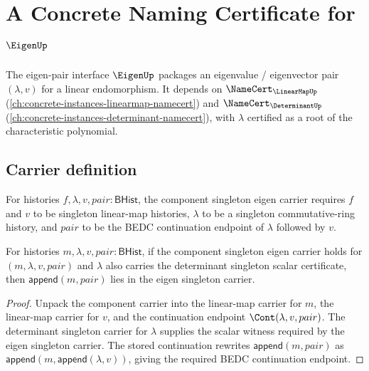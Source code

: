 \chapter{A Concrete Naming Certificate for $\EigenUp$}
\label{ch:concrete-instances-eigen-namecert}

The eigen-pair interface $\EigenUp$ packages an eigenvalue / eigenvector pair $(\lambda, v)$ for a linear endomorphism. It depends on $\NameCert_{\LinearMapUp}$ (\autoref{ch:concrete-instances-linearmap-namecert}) and $\NameCert_{\DeterminantUp}$ (\autoref{ch:concrete-instances-determinant-namecert}), with $\lambda$ certified as a root of the characteristic polynomial.

\section{Carrier definition}
\label{sec:eigen-carrier}

\begin{definition}
\label{def:eigen-component-singleton-carrier}
For histories $f,\lambda,v,pair:\mathsf{BHist}$, the component singleton
eigen carrier requires $f$ and $v$ to be singleton linear-map histories,
$\lambda$ to be a singleton commutative-ring history, and $pair$ to be the
BEDC continuation endpoint of $\lambda$ followed by $v$.
\end{definition}

\begin{theorem}
\label{thm:eigen-component-singleton-carrier-singleton-append}
For histories $m,\lambda,v,pair:\mathsf{BHist}$, if the component singleton
eigen carrier holds for $(m,\lambda,v,pair)$ and $\lambda$ also carries the
determinant singleton scalar certificate, then
$\mathsf{append}(m,pair)$ lies in the eigen singleton carrier.
\end{theorem}
\begin{proof}
Unpack the component carrier into the linear-map carrier for $m$, the
linear-map carrier for $v$, and the continuation endpoint
$\Cont(\lambda,v,pair)$. The determinant singleton carrier for $\lambda$
supplies the scalar witness required by the eigen singleton carrier. The
stored continuation rewrites $\mathsf{append}(m,pair)$ as
$\mathsf{append}(m,\mathsf{append}(\lambda,v))$, giving the required BEDC
continuation endpoint.
\end{proof}

